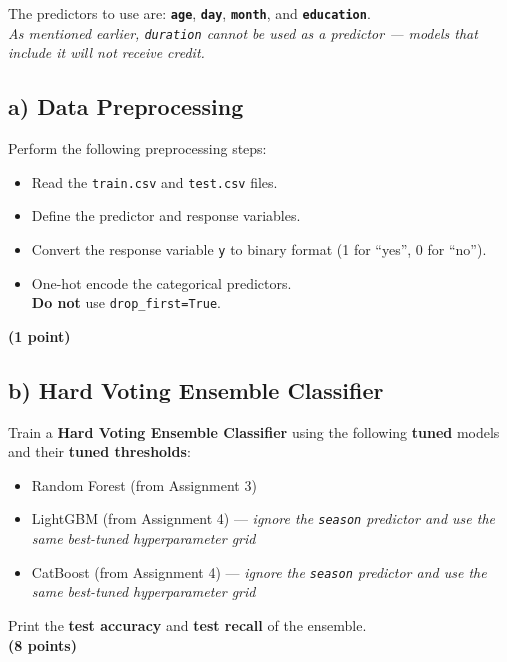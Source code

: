 \documentclass[
  letterpaper,
  DIV=11,
  numbers=noendperiod]{scrreprt}
\providecommand{\tightlist}{%
  \setlength{\itemsep}{0pt}\setlength{\parskip}{0pt}}\usepackage{longtable,booktabs,array}
\begin{document}
The predictors to use are: \textbf{\texttt{age}}, \textbf{\texttt{day}},
\textbf{\texttt{month}}, and \textbf{\texttt{education}}.\\
\emph{As mentioned earlier, \texttt{duration} cannot be used as a
predictor --- models that include it will not receive credit.}

\subsection{a) Data Preprocessing}\label{a-data-preprocessing}

Perform the following preprocessing steps:

\begin{itemize}
\tightlist
\item
  Read the \texttt{train.csv} and \texttt{test.csv} files.
\item
  Define the predictor and response variables.
\item
  Convert the response variable \texttt{y} to binary format (1 for
  ``yes'', 0 for ``no'').
\item
  One-hot encode the categorical predictors.\\
  \textbf{Do not} use \texttt{drop\_first=True}.
\end{itemize}

\textbf{(1 point)}

\subsection{b) Hard Voting Ensemble
Classifier}\label{b-hard-voting-ensemble-classifier}

Train a \textbf{Hard Voting Ensemble Classifier} using the following
\textbf{tuned} models and their \textbf{tuned thresholds}:

\begin{itemize}
\tightlist
\item
  Random Forest (from Assignment 3)\\
\item
  LightGBM (from Assignment 4) --- \emph{ignore the \texttt{season}
  predictor and use the same best-tuned hyperparameter grid}\\
\item
  CatBoost (from Assignment 4) --- \emph{ignore the \texttt{season}
  predictor and use the same best-tuned hyperparameter grid}
\end{itemize}

Print the \textbf{test accuracy} and \textbf{test recall} of the
ensemble.\\
\textbf{(8 points)}
\end{document}
